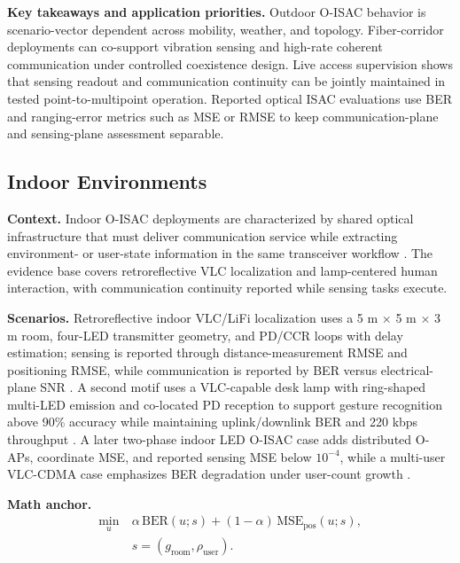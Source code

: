 \documentclass[lettersize,journal]{IEEEtran}
\begin{document}
\textbf{Key takeaways and application priorities.} Outdoor O-ISAC behavior is scenario-vector dependent across mobility, weather, and topology. Fiber-corridor deployments can co-support vibration sensing and high-rate coherent communication under controlled coexistence design. Live access supervision shows that sensing readout and communication continuity can be jointly maintained in tested point-to-multipoint operation. Reported optical ISAC evaluations use BER and ranging-error metrics such as MSE or RMSE to keep communication-plane and sensing-plane assessment separable.

\subsection{Indoor Environments}

\textbf{Context.} Indoor O-ISAC deployments are characterized by shared optical infrastructure that must deliver communication service while extracting environment- or user-state information in the same transceiver workflow \cite{O_ISAC_011,O_ISAC_030}. The evidence base covers retroreflective VLC localization and lamp-centered human interaction, with communication continuity reported while sensing tasks execute.

\textbf{Scenarios.} Retroreflective indoor VLC/LiFi localization uses a 5 m $\times$ 5 m $\times$ 3 m room, four-LED transmitter geometry, and PD/CCR loops with delay estimation; sensing is reported through distance-measurement RMSE and positioning RMSE, while communication is reported by BER versus electrical-plane SNR \cite{O_ISAC_011}. A second motif uses a VLC-capable desk lamp with ring-shaped multi-LED emission and co-located PD reception to support gesture recognition above 90\% accuracy while maintaining uplink/downlink BER and 220 kbps throughput \cite{O_ISAC_030}. A later two-phase indoor LED O-ISAC case adds distributed O-APs, coordinate MSE, and reported sensing MSE below $10^{-4}$, while a multi-user VLC-CDMA case emphasizes BER degradation under user-count growth \cite{O_ISAC_108,O_ISAC_388}.

\textbf{Math anchor.}
\begin{equation}
\begin{split}
\min_{u}\ &\alpha\,\mathrm{BER}(u;s) + (1-\alpha)\,\mathrm{MSE}_{\mathrm{pos}}(u;s),\\
&s=(g_{\mathrm{room}},\rho_{\mathrm{user}}).
\end{split}
\end{equation}
\end{document}
